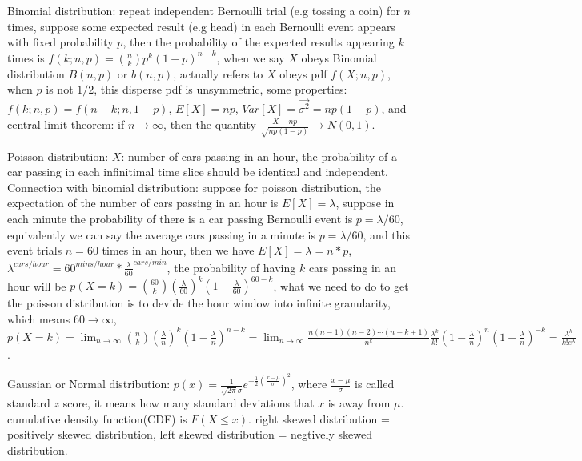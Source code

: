 \documentclass{llncs}
\begin{document}
Binomial distribution: repeat independent Bernoulli trial (e.g tossing a coin) for $n$ times, suppose some expected result (e.g head) in each Bernoulli event appears with fixed probability $p$, then the probability of the expected results appearing $k$ times is $f(k;n,p)=\binom{n}{k}p^k(1-p)^{n-k}$, when we say $X$ obeys Binomial distribution $B(n,p)$ or $b(n,p)$, actually refers to $X$ obeys pdf $f(X;n,p)$, when $p$ is not $1/2$, this disperse pdf is unsymmetric, some properties: $f(k;n,p)=f(n-k;n,1-p)$, $E[X]=np$, $Var[X]=\overrightarrow{\sigma^2}=np(1-p)$, and central limit theorem: if $n\rightarrow\infty$, then the quantity $\frac{X-np}{\sqrt{np(1-p)}}\rightarrow N(0,1)$.

Poisson distribution: $X$: number of cars passing in an hour, the probability of a car passing in each infinitimal time slice should be identical and independent. Connection with binomial distribution: suppose for poisson distribution, the expectation of the number of cars passing in an hour is $E[X]=\lambda$, suppose in each minute the probability of there is a car passing Bernoulli event is $p=\lambda/60$, equivalently we can say the average cars passing in a minute is $p=\lambda/60$, and this event trials $n=60$ times in an hour, then we have $E[X]=\lambda=n*p$, $\lambda^{cars/hour}=60^{mins/hour}*\frac{\lambda}{60}^{cars/min}$, the probability of having $k$ cars passing in an hour will be $p(X=k)=\binom{60}{k}(\frac{\lambda}{60})^k(1-\frac{\lambda}{60})^{60-k}$, what we need to do to get the poisson distribution is to devide the hour window into infinite granularity, which means $60\rightarrow\infty$, $p(X=k)=\lim_{n\rightarrow\infty}\binom{n}{k}(\frac{\lambda}{n})^k(1-\frac{\lambda}{n})^{n-k}=\lim_{n\rightarrow\infty}\frac{n(n-1)(n-2)\cdots(n-k+1)}{n^k}\frac{\lambda^k}{k!}(1-\frac{\lambda}{n})^n(1-\frac{\lambda}{n})^{-k}=\frac{\lambda^k}{k!e^\lambda}$.

Gaussian or Normal distribution: $p(x)=\frac{1}{\sqrt{2\pi}\sigma}e^{-\frac{1}{2}(\frac{x-\mu}{\sigma})^2}$, where $\frac{x-\mu}{\sigma}$ is called standard $z$ score, it means how many standard deviations that $x$ is away from $\mu$. cumulative density function(CDF) is $F(X\leq x)$. right skewed distribution = positively skewed distribution, left skewed distribution = negtively skewed distribution.
\begin{figure}
\centering
\def\svgwidth{\columnwidth}

\end{figure}
\end{document}
